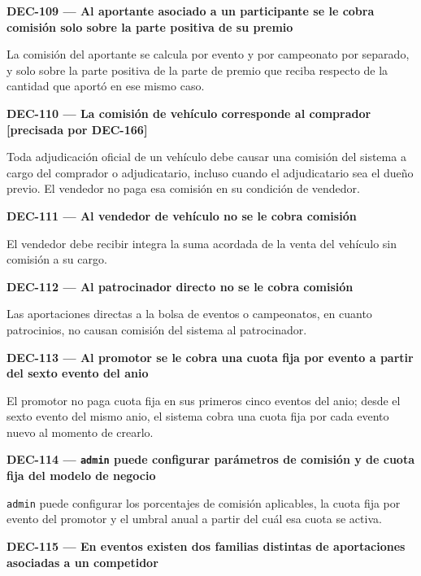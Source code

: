 \documentclass[10pt,letterpaper]{article}
\begin{document}
\noindent\textbf{DEC-109 --- Al aportante asociado a un participante se le cobra comisión solo sobre la parte positiva de su premio}\par
La comisión del aportante se calcula por evento y por campeonato por separado, y solo sobre la parte positiva de la parte de premio que reciba respecto de la cantidad que aportó en ese mismo caso.\par\vspace{0.45em}
\noindent\textbf{DEC-110 --- La comisión de vehículo corresponde al comprador [precisada por DEC-166]}\par
Toda adjudicación oficial de un vehículo debe causar una comisión del sistema a cargo del comprador o adjudicatario, incluso cuando el adjudicatario sea el dueño previo. El vendedor no paga esa comisión en su condición de vendedor.\par\vspace{0.45em}
\noindent\textbf{DEC-111 --- Al vendedor de vehículo no se le cobra comisión}\par
El vendedor debe recibir integra la suma acordada de la venta del vehículo sin comisión a su cargo.\par\vspace{0.45em}
\noindent\textbf{DEC-112 --- Al patrocinador directo no se le cobra comisión}\par
Las aportaciones directas a la bolsa de eventos o campeonatos, en cuanto patrocinios, no causan comisión del sistema al patrocinador.\par\vspace{0.45em}
\noindent\textbf{DEC-113 --- Al promotor se le cobra una cuota fija por evento a partir del sexto evento del anio}\par
El promotor no paga cuota fija en sus primeros cinco eventos del anio; desde el sexto evento del mismo anio, el sistema cobra una cuota fija por cada evento nuevo al momento de crearlo.\par\vspace{0.45em}
\noindent\textbf{DEC-114 --- \texttt{admin} puede configurar parámetros de comisión y de cuota fija del modelo de negocio}\par
\texttt{admin} puede configurar los porcentajes de comisión aplicables, la cuota fija por evento del promotor y el umbral anual a partir del cuál esa cuota se activa.\par\vspace{0.45em}
\noindent\textbf{DEC-115 --- En eventos existen dos familias distintas de aportaciones asociadas a un competidor}\par
\end{document}
